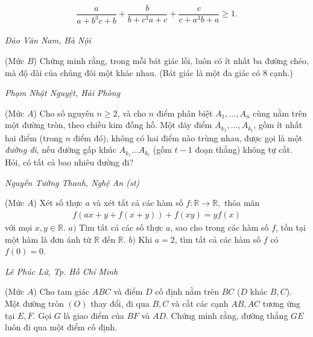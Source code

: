 \begin{multicols}{2}
\begin{align*}
		\dfrac{a}{a\!+\!b^{3} c\!+\!b}+\dfrac{b}{b\!+\!c^{3} a\!+\!c}+\dfrac{c}{c\!+\!a^{3} b\!+a} \ge 1.
	\end{align*}
	\begin{flushright}
		\textit{Đào Văn Nam, Hà Nội}
	\end{flushright}
	{}
	(Mức $B$) Chứng minh rằng, trong mỗi bát giác lồi, luôn có ít nhất ba đường chéo, mà độ dài của chúng đôi một khác nhau. 
	\vskip 0.05cm
	(Bát giác là một đa giác có $8$ cạnh.)
	\begin{flushright}
		\textit{Phạm Nhật Nguyệt, Hải Phòng}
	\end{flushright}
	{}
	(Mức $A$) Cho số nguyên $n\ge2$, và cho $n$ điểm phân biệt $A_1,\ldots,A_n$ cùng nằm trên một đường tròn, theo chiều kim đồng hồ. Một dãy điểm  $A_{k_1},\ldots,A_{k_t}$, gồm ít nhất hai điểm  (trong $n$ điểm đó), không có hai điểm nào trùng nhau, được gọi là một {\it đường đi}, nếu đường gấp khúc $A_{k_1}\ldots A_{k_t}$ (gồm $t-1$ đoạn thẳng) không tự cắt.  Hỏi, có tất cả bao nhiêu đường đi?
	\begin{flushright}
		\textit{Nguyễn Tường Thanh, Nghệ An (st)}
	\end{flushright}
	{}
	(Mức $A$) Xét số thực $a$ và xét tất cả các hàm số $f: \mathbb R \rightarrow \mathbb R,$ thỏa mãn
	\begin{align*}
		f(a x+y+f(x+y))+f(x y)=y f(x)
	\end{align*}
	với mọi $x,y\in\mathbb R$. 
	\vskip 0.05cm
	$a)$ Tìm tất cả các số thực $a$, sao cho trong các hàm số $f$, tồn tại một hàm là đơn ánh từ $\mathbb R$ đến $\mathbb R$. 
	\vskip 0.05cm
	$b)$ Khi $a=2$, tìm tất cả các hàm số $f$ có $f(0)=0$. 
	\begin{flushright}
		\textit{Lê Phúc Lữ, Tp. Hồ Chí Minh}
	\end{flushright}
	{}
	(Mức $A$) Cho tam giác $A B C$ và điểm $D$ cố định nằm trên $B C$ ($D$ khác $B,C$). Một đường tròn $(O)$ thay đổi,  đi qua $B, C$ và cắt các cạnh $A B, A C$ tương ứng tại $E, F$. Gọi $G$ là giao điểm của $B F$ và $A D$. Chứng minh rằng, đường thẳng $G E$ luôn đi qua một điểm cố định.
	\begin{center}
		\begin{tikzpicture}[line cap=round,line join=round,>=triangle 45,x=1cm,y=1cm,scale=0.6]

\end{tikzpicture}
\end{center}
\end{multicols}
